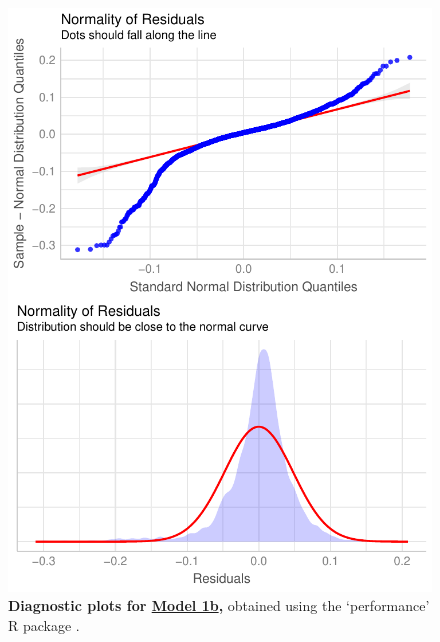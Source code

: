 \begin{figure}[h!]
\centering
\includegraphics[scale=0.7]{Supporting/Chapter3/Figures/Diagnostics/SI_diagnostics_Model1b}
\caption[Diagnostic plots for Model 1b]{\textbf{Diagnostic plots for \underline{Model 1b},} obtained using the `performance' R package \citep{performance}.}
\label{SI3_F10}
\end{figure}

\newpage

